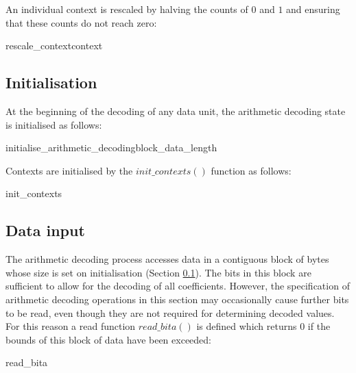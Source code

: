 An individual context is rescaled by halving the counts of $0$ and $1$ and ensuring that
these counts do not reach zero:

\begin{pseudo}{rescale\_context}{context}
\end{pseudo}

\subsection{Initialisation}
\label{initarith}

At the beginning of the decoding of any data unit, the arithmetic
decoding state is initialised as follows:

\begin{pseudo}{initialise\_arithmetic\_decoding}{block\_data\_length}
\end{pseudo}

Contexts are initialised by the $init\_contexts()$ function as follows:

\begin{pseudo}{init\_contexts}{}
\bsEND
\end{pseudo}

\subsection{Data input}
\label{inputarith}

The arithmetic decoding process accesses data in a contiguous block of bytes
whose size is set on initialisation (Section \ref{initarith}). The bits in this
block are sufficient to allow for the
decoding of all coefficients. However, the specification of arithmetic
decoding operations in this section may occasionally cause further bits to be read,
even though they are not required for determining decoded values. For this
reason a read function $read\_bita()$ is defined which returns $0$ if the
bounds of this block of data have been exceeded:

\begin{pseudo}{read\_bita}{}
\bsELSE
\bsEND
\end{pseudo}

